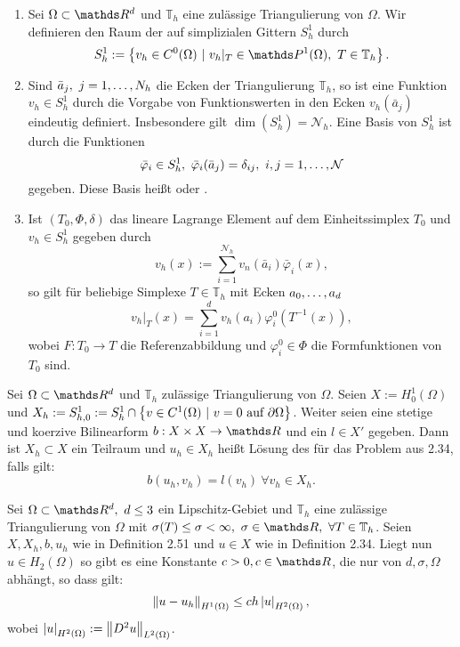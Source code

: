 \begin{enumerate}[(1)]
\item Sei $\Omega\subset\R^d$ und $\mathbb{T}_h$ eine zulässige Triangulierung von $\Omega$.
Wir definieren den Raum der  auf simplizialen Gittern $S_h^1$ durch
\[
S_h^1 := \penbrace{v_h\in C^0(\Omega)~|~v_h|_T\in \Pw^1(\Omega),~T\in\mathbb{T}_h}.
\]
\item Sind $\bar{a}_j,~j=1, \dots ,N_h$ die Ecken der Triangulierung $\mathbb{T}_h$, so ist eine Funktion $v_h\in S_h^1$ durch die Vorgabe von Funktionswerten in den Ecken $v_h(\bar{a}_j)$ eindeutig definiert.
Insbesondere gilt $\dim(S_h^1)= \mathcal{N}_h$.
Eine Basis von $S_h^1$ ist durch die Funktionen
\[
\bar{\varphi}_i\in S_h^1,~\bar{\varphi}_i(\bar{a}_j)=\delta_{ij},~i,j=1, \dots ,\mathcal{N}
\]
gegeben.
Diese Basis heißt  oder .
\item Ist $(T_0,\Phi,\delta)$ das lineare Lagrange Element auf dem Einheitssimplex $T_0$ und $v_h\in S_h^1$ gegeben durch
\[
v_h(x):=\sum_{i=1}^{\mathcal{N}_h}v_n(\bar{a}_i)\bar{\varphi}_i(x),
\]
so gilt für beliebige Simplexe $T\in \mathbb{T}_h$ mit Ecken $a_0, \dots ,a_d$
\[
v_h|_T(x) = \sum_{i=1}^{d}v_h(a_i)\varphi_i^0(T^{-1}(x)),
\]
wobei $F:T_0\to T$ die Referenzabbildung und $\varphi_i^0\in \Phi$ die Formfunktionen von $T_0$ sind.
\end{enumerate}

Sei $\Omega\subset\R^d$ und $\mathbb{T}_h$ zulässige Triangulierung von $\Omega$.
Seien $X:=H_0^1(\Omega)$ und $X_h:= S_{h,0}^1:=S_h^1\cap \left\{v\in C^1(\Omega)~|~v=0 \text{ auf }\partial\Omega\right\}$.
Weiter seien eine stetige und koerzive Bilinearform $b:X\times X\to \R$ und ein $l\in X'$ gegeben.
Dann ist $X_h\subset X$ ein Teilraum und $u_h\in X_h$ heißt Lösung des  für das Problem aus 2.34, falls gilt:
\[
b(u_h,v_h)= l(v_h) ~\forall v_h\in X_h.
\]

Sei $\Omega\subset\R^d,~d\le 3$ ein Lipschitz-Gebiet und $\mathbb{T}_h$ eine zulässige Triangulierung von $\Omega$ mit $\sigma(T)\le \sigma<\infty,~\sigma\in \R,~\forall T\in \mathbb{T}_h$.
Seien $X,X_h,b,u_h$ wie in Definition 2.51 und $u\in X$ wie in Definition 2.34.
Liegt nun $u\in H_2(\Omega)$ so gibt es eine Konstante $c>0,c\in \R$, die nur von $d,\sigma,\Omega$ abhängt, so dass gilt:
\begin{align}
\left\Vert u-u_h\right\Vert_{H^1(\Omega)}\le ch\left\vert u\right\vert_{H^2(\Omega)},
\end{align}
wobei $\left\vert u\right\vert_{H^2(\Omega)}:= \left\Vert D^2u\right\Vert_{L^2(\Omega)}$.\\


